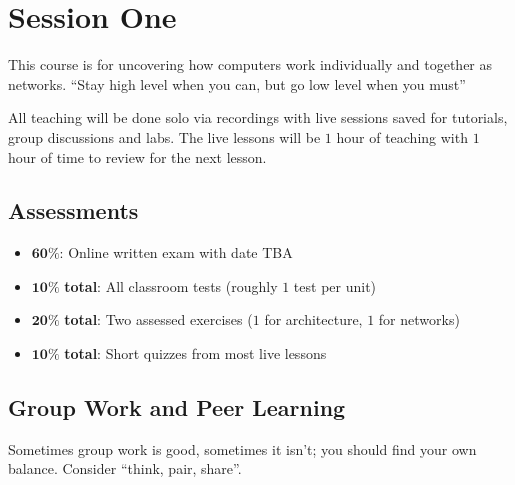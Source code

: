 \section{Session One}\label{sec:session_one}

This course is for uncovering how computers work individually and together as networks.
``Stay high level when you can, but go low level when you must''

All teaching will be done solo via recordings with live sessions saved for tutorials, group discussions and labs.
The live lessons will be \(1\) hour of teaching with \(1\) hour of time to review for the next lesson.

\subsection{Assessments}\label{sub:assessments}

\begin{itemize}
    \item \(\mathbf{60\%}\): Online written exam with date TBA
    \item \(\mathbf{10\%}\) \textbf{total}: All classroom tests (roughly \(1\) test per unit)
    \item \(\mathbf{20\%}\) \textbf{total}: Two assessed exercises (\(1\) for architecture, \(1\) for networks)
    \item \(\mathbf{10\%}\) \textbf{total}: Short quizzes from most live lessons
\end{itemize}

\subsection{Group Work and Peer Learning}\label{sub:group_work_and_peer_learning}

Sometimes group work is good, sometimes it isn't; you should find your own balance.
Consider ``think, pair, share''.
